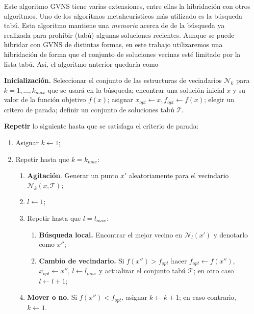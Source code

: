 \documentclass[
]{article}
\providecommand{\tightlist}{%
  \setlength{\itemsep}{0pt}\setlength{\parskip}{0pt}}
\begin{document}
Este algoritmo GVNS tiene varias extensiones, entre ellas la hibridación
con otros algoritmos. Uno de los algoritmos metaheurísticos más
utilizado es la búsqueda tabú. Esta algoritmo mantiene una
\emph{memoria} acerca de de la búsqueda ya realizada para prohibir
(tabú) algunas soluciones recientes. Aunque se puede hibridar con GVNS
de distintas formas, en este trabajo utilizaremos una hibridación de
forma que el conjunto de soluciones vecinas esté limitado por la lista
tabú. Así, el algoritmo anterior quedaría como

\textbf{Inicialización.} Seleccionar el conjunto de las estructuras de
vecindarios \(\mathcal{N}_k\) para \(k=1,\ldots, k_{max}\) que se usará
en la búsqueda; encontrar una solución inicial \(x\) y su valor de la
función objetivo \(f(x)\); asignar
\(x_{opt}\leftarrow x, f_{opt}\leftarrow f(x)\); elegir un critero de
parada; definir un conjunto de soluciones tabú \(\mathcal{T}\).

\textbf{Repetir} lo siguiente hasta que se satisfaga el criterio de
parada:

\begin{enumerate}
\def\labelenumi{(\arabic{enumi})}
\tightlist
\item
  Asignar \(k\leftarrow 1\);
\item
  Repetir hasta que \(k=k_{max}\):

  \begin{enumerate}
  \def\labelenumii{(\alph{enumii})}
  \tightlist
  \item
    \textbf{Agitación}. Generar un punto \(x'\) aleatoriamente para el
    vecindario \(\mathcal{N}_k(x, \mathcal{T})\);
  \item
    \(l\leftarrow 1\);
  \item
    Repetir hasta que \(l=l_{max}\):

    \begin{enumerate}
    \def\labelenumiii{(\roman{enumiii})}
    \tightlist
    \item
      \textbf{Búsqueda local.} Encontrar el mejor vecino en
      \(\mathcal{N}_l(x')\) y denotarlo como \(x''\);
    \item
      \textbf{Cambio de vecindario.} Si \(f(x'') > f_{opt}\) hacer
      \(f_{opt}\leftarrow f(x'')\), \(x_{opt}\leftarrow x''\),
      \(l\leftarrow l_{max}\) y actualizar el conjunto tabú
      \(\mathcal{T}\); en otro caso \(l\leftarrow l + 1\);
    \end{enumerate}
  \item
    \textbf{Mover o no.} Si \(f(x'') < f_{opt}\), asignar
    \(k \leftarrow k + 1\); en caso contrario, \(k\leftarrow 1\).
  \end{enumerate}
\end{enumerate}
\end{document}
